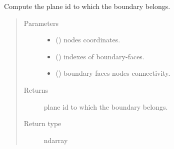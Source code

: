 \documentclass[letterpaper,10pt,english]{sphinxmanual}
\begin{document}
\begin{fulllineitems}
\label{\detokenize{petgem/mesh:petgem.mesh.computeFacePlane}}
Compute the plane id to which the boundary belongs.
\begin{quote}\begin{description}
\item[{Parameters}] \leavevmode\begin{itemize}
\item {} 
 () \textendash{} nodes coordinates.

\item {} 
 () \textendash{} indexes of boundary-faces.

\item {} 
 () \textendash{} boundary-faces-nodes connectivity.

\end{itemize}

\item[{Returns}] \leavevmode
plane id to which the boundary belongs.

\item[{Return type}] \leavevmode
ndarray

\end{description}\end{quote}

\end{fulllineitems}

\end{document}
